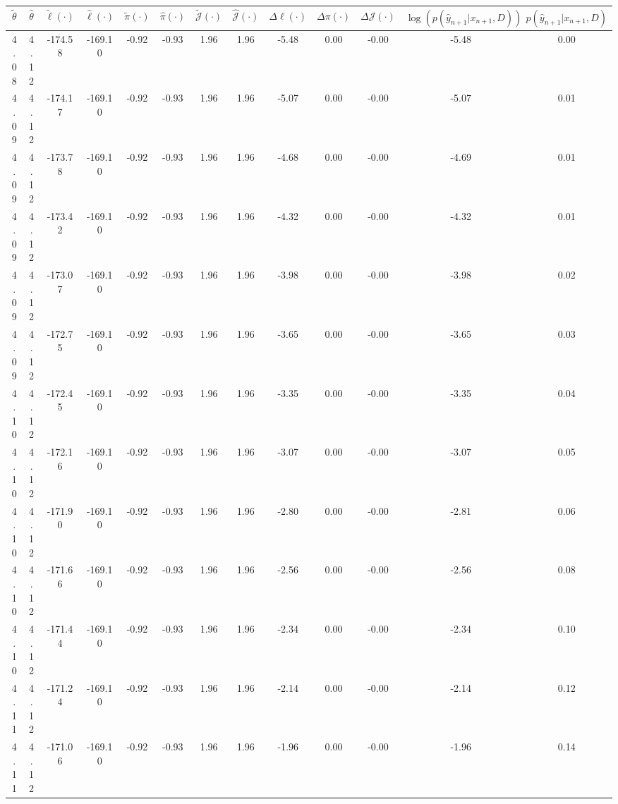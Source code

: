 \begin{table}[htbp]
        \centering
        \tiny
        \begin{adjustbox}{angle=90}
            \begin{tabular}{|c|c|c|c|c|c|c|c|c|c|c|c|c|}
                \hline
                 $\tilde{\theta}$ & $\hat{\theta}$ & $\tilde{\ell}(\cdot)$ & $\hat{\ell}(\cdot)$ & $\tilde{\pi}(\cdot)$ & $\hat{\pi}(\cdot)$ & $\tilde{\mathcal{J}}(\cdot)$ & $\hat{\mathcal{J}}(\cdot)$ & $\Delta \ell(\cdot)$ & $\Delta \pi(\cdot)$ & $\Delta \mathcal{J}(\cdot)$ & $\log(p(\hat{y}_{n+1}|x_{n+1}, D))$ & $p(\hat{y}_{n+1}|x_{n+1}, D)$ \\
                \hline
                 4.08 & 4.12 & -174.58 & -169.10 & -0.92 & -0.93 & 1.96 & 1.96 & -5.48 & 0.00 & -0.00 & -5.48 & 0.00\\ \hline
 4.09 & 4.12 & -174.17 & -169.10 & -0.92 & -0.93 & 1.96 & 1.96 & -5.07 & 0.00 & -0.00 & -5.07 & 0.01\\ \hline
 4.09 & 4.12 & -173.78 & -169.10 & -0.92 & -0.93 & 1.96 & 1.96 & -4.68 & 0.00 & -0.00 & -4.69 & 0.01\\ \hline
 4.09 & 4.12 & -173.42 & -169.10 & -0.92 & -0.93 & 1.96 & 1.96 & -4.32 & 0.00 & -0.00 & -4.32 & 0.01\\ \hline
 4.09 & 4.12 & -173.07 & -169.10 & -0.92 & -0.93 & 1.96 & 1.96 & -3.98 & 0.00 & -0.00 & -3.98 & 0.02\\ \hline
 4.09 & 4.12 & -172.75 & -169.10 & -0.92 & -0.93 & 1.96 & 1.96 & -3.65 & 0.00 & -0.00 & -3.65 & 0.03\\ \hline
 4.10 & 4.12 & -172.45 & -169.10 & -0.92 & -0.93 & 1.96 & 1.96 & -3.35 & 0.00 & -0.00 & -3.35 & 0.04\\ \hline
 4.10 & 4.12 & -172.16 & -169.10 & -0.92 & -0.93 & 1.96 & 1.96 & -3.07 & 0.00 & -0.00 & -3.07 & 0.05\\ \hline
 4.10 & 4.12 & -171.90 & -169.10 & -0.92 & -0.93 & 1.96 & 1.96 & -2.80 & 0.00 & -0.00 & -2.81 & 0.06\\ \hline
 4.10 & 4.12 & -171.66 & -169.10 & -0.92 & -0.93 & 1.96 & 1.96 & -2.56 & 0.00 & -0.00 & -2.56 & 0.08\\ \hline
 4.10 & 4.12 & -171.44 & -169.10 & -0.92 & -0.93 & 1.96 & 1.96 & -2.34 & 0.00 & -0.00 & -2.34 & 0.10\\ \hline
 4.11 & 4.12 & -171.24 & -169.10 & -0.92 & -0.93 & 1.96 & 1.96 & -2.14 & 0.00 & -0.00 & -2.14 & 0.12\\ \hline
 4.11 & 4.12 & -171.06 & -169.10 & -0.92 & -0.93 & 1.96 & 1.96 & -1.96 & 0.00 & -0.00 & -1.96 & 0.14\\ \hline

\end{tabular}
\end{adjustbox}
\end{table}
